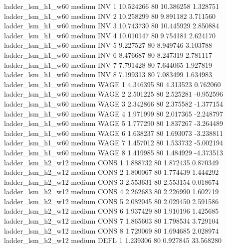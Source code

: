   ladder_lsm_h1_w60     medium      INV                 1 10.524266 80      10.386258           1.328751
  ladder_lsm_h1_w60     medium      INV                 2 10.258299 80       9.891182           3.711560
  ladder_lsm_h1_w60     medium      INV                 3 10.743730 80      10.445929           2.850884
  ladder_lsm_h1_w60     medium      INV                 4 10.010147 80       9.754181           2.624170
  ladder_lsm_h1_w60     medium      INV                 5  9.227527 80       8.949746           3.103788
  ladder_lsm_h1_w60     medium      INV                 6  8.476687 80       8.247319           2.781117
  ladder_lsm_h1_w60     medium      INV                 7  7.791428 80       7.644065           1.927819
  ladder_lsm_h1_w60     medium      INV                 8  7.199313 80       7.083499           1.634983
  ladder_lsm_h1_w60     medium     WAGE                 1  4.346395 80       4.313523           0.762060
  ladder_lsm_h1_w60     medium     WAGE                 2  2.501225 80       2.525281          -0.952596
  ladder_lsm_h1_w60     medium     WAGE                 3  2.342866 80       2.375582          -1.377154
  ladder_lsm_h1_w60     medium     WAGE                 4  1.971999 80       2.017365          -2.248797
  ladder_lsm_h1_w60     medium     WAGE                 5  1.777290 80       1.837267          -3.264489
  ladder_lsm_h1_w60     medium     WAGE                 6  1.638237 80       1.693073          -3.238811
  ladder_lsm_h1_w60     medium     WAGE                 7  1.457012 80       1.533732          -5.002194
  ladder_lsm_h1_w60     medium     WAGE                 8  1.419985 80       1.484929          -4.373513
  ladder_lsm_h2_w12     medium     CONS                 1  1.888732 80       1.872435           0.870349
  ladder_lsm_h2_w12     medium     CONS                 2  1.800067 80       1.774439           1.444292
  ladder_lsm_h2_w12     medium     CONS                 3  2.553631 80       2.553154           0.018674
  ladder_lsm_h2_w12     medium     CONS                 4  2.262683 80       2.226990           1.602719
  ladder_lsm_h2_w12     medium     CONS                 5  2.082045 80       2.029450           2.591586
  ladder_lsm_h2_w12     medium     CONS                 6  1.937429 80       1.910196           1.425685
  ladder_lsm_h2_w12     medium     CONS                 7  1.865603 80       1.798534           3.729104
  ladder_lsm_h2_w12     medium     CONS                 8  1.729069 80       1.694685           2.028974
  ladder_lsm_h2_w12     medium     DEFL                 1  1.239306 80       0.927845          33.568280
